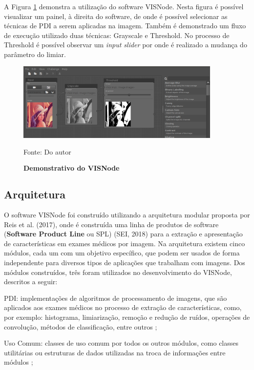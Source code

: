 \documentclass[
	12pt,				%
	oneside,			%
	a4paper,			%
	english,			%
	french,				%
	spanish,			%
	brazil,				%
	]{abntex2}
\begin{document}
A Figura \ref{fig:visnode} demonstra a utilização do software VISNode. Nesta figura é possível visualizar um painel, à direita do software, de onde é possível selecionar as técnicas de PDI a serem aplicadas na imagem. Também é demonstrado um fluxo de execução utilizado duas técnicas: Grayscale e Threshold. No processo de Threshold é possível observar um \textit{input slider} por onde é realizado a mudança do parâmetro do limiar.

\begin{figure}[ht]
\centering
\caption{\textbf{Demonstrativo do VISNode}}
\includegraphics[width=0.9\textwidth]{imagens/visnode.png}

Fonte: Do autor
\label{fig:visnode}
\end{figure}

\subsection{Arquitetura}

O software VISNode foi construído utilizando a arquitetura modular proposta por Reis et al. (2017), onde é construída uma linha de produtos de software (\textbf{Software Product Line} ou SPL) (SEI, 2018)  para a extração e apresentação de características em exames médicos por imagem. Na arquitetura existem cinco módulos, cada um com um objetivo específico, que podem ser usados de forma independente para diversos tipos de aplicações que trabalham com imagens. Dos módulos construídos, três foram utilizados no desenvolvimento do VISNode, descritos a seguir:

PDI: implementações de algoritmos de processamento de imagens, que são aplicados aos exames médicos no processo de extração de características, como, por exemplo: histograma, limiarização, remoção e redução de ruídos, operações de convolução, métodos de classificação, entre outros \cite{reisferramenta}; 

Uso Comum: classes de uso  comum  por todos os outros módulos, como classes utilitárias ou estruturas de dados utilizadas na troca de informações entre módulos \cite{reisferramenta}; 
\end{document}
